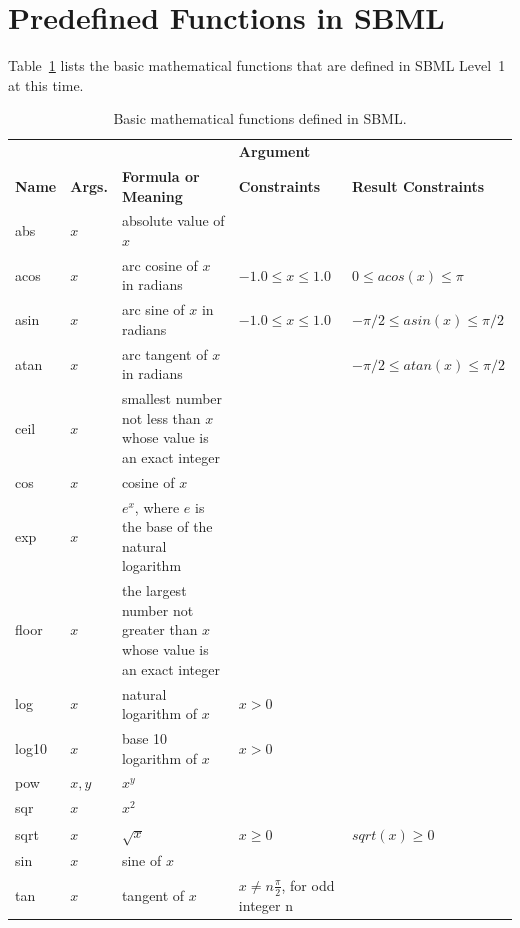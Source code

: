 \documentclass[10pt]{cekarticle}
\begin{document}
\newpage

\section{Predefined Functions in SBML}
\label{apdx:predefined-functions}

Table~\ref{tab:simplemath} lists the basic mathematical functions that are
defined in SBML Level~1 at this time.

\begin{table}[hb]
  \begin{center}
    \begin{tabular}{@{}p{1.05cm}p{0.95cm}p{5cm}p{4cm}p{3.8cm}@{}}
      \toprule
      &                &                             & \textbf{Argument} \\
      \textbf{Name} & \textbf{Args.} & \textbf{Formula or Meaning} & \textbf{Constraints} & \textbf{Result Constraints} \\
      \midrule
      abs   & $x$ & absolute value of $x$\\
      acos  & $x$ & arc cosine of $x$ in radians & $-1.0 \leq x \leq 1.0$ & $0 \leq acos(x) \leq \pi$ \\
      asin  & $x$ & arc sine of $x$ in radians & $-1.0 \leq x \leq 1.0$ & $-\pi/2 \leq asin(x) \leq \pi/2$ \\
      atan  & $x$ & arc tangent of $x$ in radians & & $-\pi/2 \leq atan(x) \leq \pi/2$ \\
      ceil  & $x$ & smallest number not less than $x$ whose value is an exact integer \\
      cos   & $x$ & cosine of $x$ \\
      exp   & $x$ & $e^x$, where $e$ is the base of the natural logarithm\\
      floor & $x$ & the largest number not greater than $x$ whose value is an exact integer \\
      log   & $x$ & natural logarithm of $x$ & $x > 0$ \\
      log10 & $x$ & base 10 logarithm of $x$ & $x > 0$ \\
      pow   & $x, y$ & $x^y$ \\
      sqr   & $x$ & $x^2$ \\
      sqrt  & $x$ & $\sqrt{x}$ & $x \geq 0$ & $sqrt(x) \geq 0$ \\
      sin   & $x$ & sine of $x$ \\
      tan   & $x$ & tangent of $x$ & $x \neq n \frac{\pi}{2}$, for odd integer n\\
      \bottomrule
    \end{tabular}
  \end{center}
  \caption{Basic mathematical functions defined in SBML.}
  \label{tab:simplemath}
\end{table}
\end{document}

